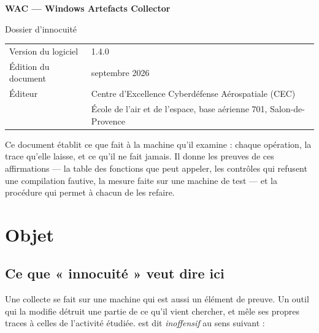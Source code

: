 \documentclass[11pt,a4paper,oneside]{report}
\begin{document}

\thispagestyle{empty}
\vspace*{\fill}
{\color{marine}\Large\bfseries WAC — Windows Artefacts Collector}\par
{\color{bleu}Dossier d'innocuité}\par
\medskip
\begin{tabular}{@{}ll@{}}
Version du logiciel & 1.4.0 \\
Édition du document & septembre 2026 \\
Éditeur & Centre d'Excellence Cyberdéfense Aérospatiale (CEC) \\
        & École de l'air et de l'espace, base aérienne 701, Salon-de-Provence \\
\end{tabular}

\bigskip
{\small\color{gris}Ce document établit ce que \wac{} fait à la machine qu'il
examine : chaque opération, la trace qu'elle laisse, et ce qu'il ne fait
jamais. Il donne les preuves de ces affirmations — la table des fonctions que
 peut appeler, les contrôles qui refusent une compilation
fautive, la mesure faite sur une machine de test — et la procédure qui permet
à chacun de les refaire.}
\vspace*{2cm}
\clearpage

\tableofcontents

\chapter{Objet}

\section{Ce que « innocuité » veut dire ici}

Une collecte se fait sur une machine qui est aussi un élément de preuve. Un
outil qui la modifie détruit une partie de ce qu'il vient chercher, et mêle ses
propres traces à celles de l'activité étudiée. \wac{} est dit \emph{inoffensif}
au sens suivant :
\end{document}
